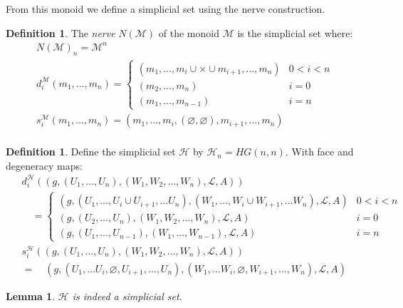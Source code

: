\documentclass[12pt]{article}
\newtheorem{lemma}[theorem]{Lemma}
\theoremstyle{definition}
\newtheorem{definition}[theorem]{Definition}
\newcommand{\1}{\mathbbm{1}}
\renewcommand{\L}{\mathcal{L}}
\newcommand{\M}{\mathcal{M}}
\renewcommand{\H}{\mathcal{H}}
\begin{document}
From this monoid we define a simplicial set using the nerve construction.

\begin{definition}
    The \emph{nerve} $N(\M)$ of the monoid $\M$ is the simplicial set where:
    \begin{align*}
        N(\M)_n = \M^n\\
        d^{\M}_i(m_1,\dots,m_n) = 
        \begin{cases}
            (m_1,\dots,m_i \cup\times\cup m_{i+1}, \dots, m_n) & 0 < i < n\\
            (m_2,\dots, m_n) & i = 0\\
            (m_1,\dots,m_{n-1}) & i = n
        \end{cases}\\
        s^{\M}_i(m_1,\dots,m_n) = (m_1, \dots, m_i, (\varnothing, \varnothing), m_{i+1}, \dots, m_n)\\
    \end{align*}
\end{definition}

\begin{definition}
Define the simplicial set $\H$ by $\H_n = HG(n,n)$. With face and degeneracy maps:
\begin{align*}
    &d_i^{\H} ((g, (U_1, \dots, U_n), (W_1, W_2, \dots, W_n), \L, A))\\
    &\quad=\begin{cases}
        (g, (U_1, \dots, U_i\cup U_{i+1}, \dots U_n), (W_1, \dots, W_i\cup W_{i+1}, \dots W_n), \L, A) & 0 < i < n\\
        (g, (U_2, \dots, U_n), (W_1, W_2, \dots, W_n), \L, A) & i = 0\\
        (g, (U_1, \dots, U_{n-1}), (W_1, \dots, W_{n-1}), \L, A) & i = n
    \end{cases}\\
    \hspace{5pt}
    &s_i^{\H}((g, (U_1, \dots, U_n), (W_1, W_2, \dots, W_n), \L, A))\\
    &=\quad (g, (U_1, \dots U_i, \varnothing, U_{i+1}, \dots, U_n), (W_1, \dots W_i, \varnothing, W_{i+1}, \dots, W_n), \L, A)
\end{align*}
\end{definition}

\begin{lemma}
    $\H$ is indeed a simplicial set.
\end{lemma}
\end{document}

